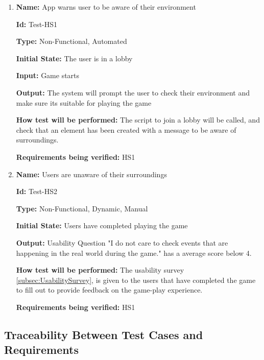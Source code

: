 \documentclass[12pt, titlepage]{article}
\begin{document}
\begin{enumerate}

\item{\textbf{Name:} App warns user to be aware of their environment} \label{itm:Test-HS1}

\textbf{Id:} Test-HS1

\textbf{Type:} Non-Functional, Automated
					
\textbf{Initial State:} The user is in a lobby
					
\textbf{Input:} Game starts
					
\textbf{Output:} The system will prompt the user to check their environment and make sure its suitable for playing the game
					
\textbf{How test will be performed:} The script to join a lobby will be called, and check that an element has been created with a message to be aware of surroundings. 

\textbf{Requirements being verified:} HS1

\item{\textbf{Name:} Users are unaware of their surroundings} \label{itm:Test-HS2}

\textbf{Id:} Test-HS2

\textbf{Type:} Non-Functional, Dynamic, Manual
					
\textbf{Initial State:} Users have completed playing the game

\textbf{Output:} Usability Question "I do not care to check events that are happening in the real world during the game." has a average score below 4.
					
\textbf{How test will be performed:} The usability survey \ref{subsec:UsabilitySurvey}, is given to the users that have completed the game to fill out to provide feedback on the game-play experience. 

\textbf{Requirements being verified:} HS1
\end{enumerate}
\subsection{Traceability Between Test Cases and Requirements}

\end{document}
